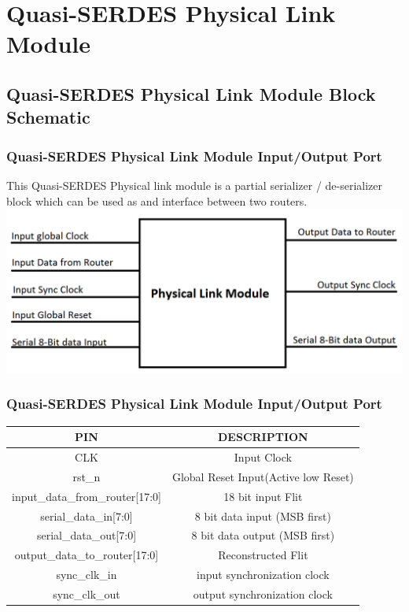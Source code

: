 
\section{Quasi-SERDES Physical Link Module}
\subsection{Quasi-SERDES Physical Link Module Block Schematic}
\begin{frame}
\frametitle{Quasi-SERDES Physical Link Module Input/Output Port}
This Quasi-SERDES Physical link module is a partial serializer / de-serializer block which can be used as and interface between two routers.\\
	\centering
	\includegraphics[scale=0.35]{./figs/physicalModule}
\end{frame}

\begin{frame}
\frametitle{Quasi-SERDES Physical Link Module Input/Output Port}
\small
\begin{center}
\begin{tabular}{||c | c||} 
\hline
\textbf{PIN} & \textbf{DESCRIPTION} \\ \hline
CLK & Input Clock \\
rst\_n & Global Reset Input(Active low Reset)\\
input\_data\_from\_router[17:0] & 18 bit input Flit\\
serial\_data\_in[7:0] & 8 bit data input (MSB first)\\
serial\_data\_out[7:0] & 8 bit data output (MSB first)\\
output\_data\_to\_router[17:0] & Reconstructed Flit \\
sync\_clk\_in & input synchronization clock \\
sync\_clk\_out & output synchronization clock \\
\hline
\end{tabular}
\end{center}
\end{frame}


